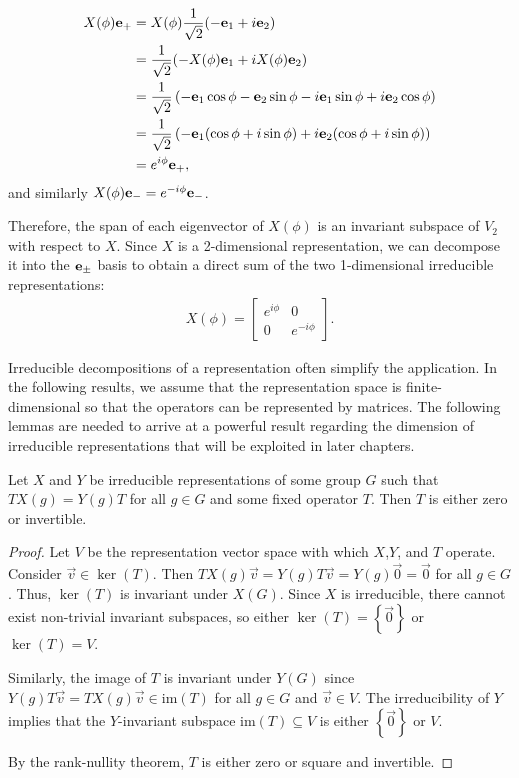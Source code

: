 \begin{example}
\begin{align}
\begin{split}
        X(\phi)\mathbf{e}_+ &= X(\phi)\frac{1}{\sqrt{2}}(-\mathbf{e}_1 + i\mathbf{e}_2) \\
        &= \frac{1}{\sqrt{2}}(-X(\phi)\mathbf{e}_1 + iX(\phi)\mathbf{e}_2) \\
        &= \frac{1}{\sqrt{2}}\left( -\mathbf{e}_1\cos\phi - \mathbf{e}_2\sin\phi -i\mathbf{e}_1\sin\phi + i\mathbf{e}_2\cos\phi \right) \\
        &= \frac{1}{\sqrt{2}}\left( -\mathbf{e}_1(\cos\phi + i\sin\phi) + i\mathbf{e}_2(\cos\phi+i\sin\phi) \right) \\
        &= e^{i\phi}\mathbf{e}_+,
        \end{split}
    \end{align}
    and similarly $X(\phi)\mathbf{e}_- = e^{-i\phi}\mathbf{e}_-$.

    Therefore, the span of each eigenvector of $X(\phi)$ is an invariant subspace of $V_2$ with respect to $X$. Since $X$ is a 2-dimensional representation, we can decompose it into the $\mathbf{e}_\pm$ basis to obtain a direct sum of the two 1-dimensional irreducible representations:
    \begin{align}
        X(\phi) = \begin{bmatrix}
            e^{i\phi} & 0\\
            0 & e^{-i\phi}
        \end{bmatrix}.
    \end{align}
\end{example}

Irreducible decompositions of a representation often simplify the application. In the following results, we assume that the representation space is finite-dimensional so that the operators can be represented by matrices. The following lemmas are needed to arrive at a powerful result regarding the dimension of irreducible representations that will be exploited in later chapters.

\begin{lemma}\label{th:irred_invertible}
    Let $X$ and $Y$ be irreducible representations of some group $G$ such that $TX(g)=Y(g)T$ for all $g\in G$ and some fixed operator $T$. Then $T$ is either zero or invertible.
\end{lemma}
\begin{proof}
    Let $V$ be the representation vector space with which $X$,$Y$, and $T$ operate. Consider $\vec{v}\in\ker(T)$. Then $TX(g)\vec{v} = Y(g)T\vec{v} = Y(g)\vec{0}=\vec{0}$ for all $g\in G$. Thus, $\ker(T)$ is invariant under $X(G)$. Since $X$ is irreducible, there cannot exist non-trivial invariant subspaces, so either $\ker(T) = \left\{ \vec{0} \right\}$ or $\ker(T) = V$.

    Similarly, the image of $T$ is invariant under $Y(G)$ since $Y(g)T\vec{v} = TX(g)\vec{v}\in\textrm{im}(T)$ for all $g\in G$ and $\vec{v}\in V$. The irreducibility of $Y$ implies that the $Y$-invariant subspace $\textrm{im}(T)\subseteq V$ is either $\left\{ \vec{0} \right\}$ or $V$.

    By the rank-nullity theorem, $T$ is either zero or square and invertible.
\end{proof}

